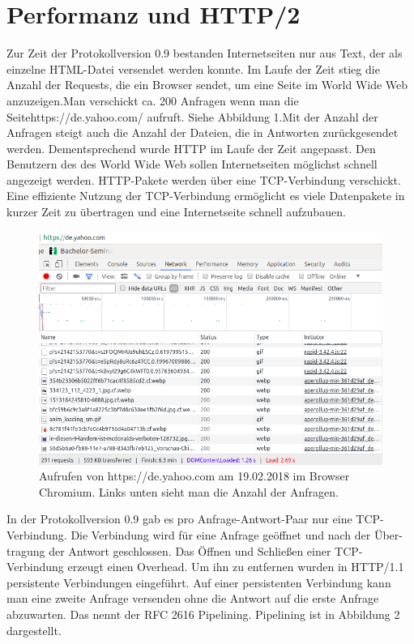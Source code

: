 \documentclass{llncs}
\begin{document}
\section{Performanz und HTTP/2}
Zur Zeit der Protokollversion 0.9 bestanden Internetseiten nur aus Text, der als einzelne HTML-Datei versendet werden konnte. Im Laufe der Zeit stieg die Anzahl der Requests, die ein Browser sendet, um eine Seite im World Wide Web anzuzeigen.Man verschickt ca. 200 Anfragen wenn man die Seite\linebreak https://de.yahoo.com/ aufruft. Siehe Abbildung 1.\newline Mit der Anzahl der Anfragen steigt auch die Anzahl der Dateien, die in Antworten zurückgesendet werden. Dementsprechend wurde HTTP im Laufe der Zeit angepasst. Den Benutzern des des World Wide Web sollen Internetseiten möglichst schnell angezeigt werden.
HTTP-Pakete werden über eine TCP-Verbindung verschickt. Eine effiziente Nutzung der TCP-Verbindung ermöglicht es viele Datenpakete in kurzer Zeit zu übertragen und eine Internetseite schnell aufzubauen.\newline

\begin{figure}
\includegraphics[width=\columnwidth]{yahooRequests}
\caption{Aufrufen von https://de.yahoo.com am 19.02.2018 im Browser Chromium. Links unten sieht man die Anzahl der Anfragen.}
\end{figure}
In der Protokollversion 0.9 gab es pro Anfrage-Antwort-Paar nur eine TCP-Verbindung. Die Verbindung wird für eine Anfrage geöffnet und nach der Über-tragung der Antwort geschlossen. Das Öffnen und Schließen einer TCP-Verbindung erzeugt einen Overhead. Um ihn zu entfernen wurden in HTTP/1.1 persistente Verbindungen eingeführt. Auf einer persistenten Verbindung kann man eine zweite Anfrage versenden ohne die Antwort auf die erste Anfrage abzuwarten. Das nennt der RFC 2616 Pipelining. Pipelining ist in Abbildung 2 dargestellt.
\end{document}
